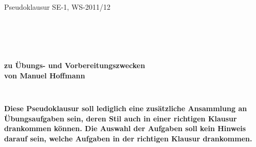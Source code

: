 \documentclass[11pt,a4paper,oneside,ngerman]{scrbook}
\begin{document}
\thispagestyle{empty}
\begin{center}
\Large{\LARGE{Pseudoklausur SE-1, WS-2011/12}}
\end{center}
\begin{verbatim}





\end{verbatim}
\begin{center}
\textbf{{zu Übungs- und Vorbereitungszwecken\\}}
\textbf{{von Manuel Hoffmann}}
\end{center}
\begin{verbatim}


\end{verbatim}
\begin{center}
\textbf{Diese Pseudoklausur soll lediglich eine zusätzliche Ansammlung an Übungsaufgaben sein, deren Stil
auch in einer richtigen Klausur drankommen können. Die Auswahl der Aufgaben soll kein Hinweis darauf sein,
welche Aufgaben in der richtigen Klausur drankommen.}
\end{center}



\newpage
\end{document}
